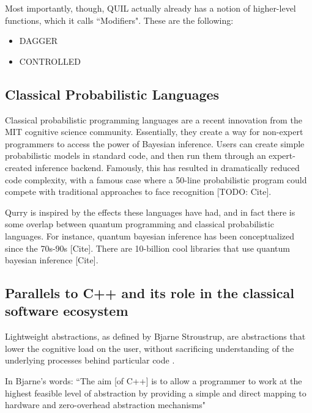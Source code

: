 \documentclass[journal]{article}
\begin{document}
Most importantly, though, QUIL actually already has a notion of higher-level functions, which it calls ``Modifiers".
These are the following:
\begin{itemize}
    \item DAGGER
    \item CONTROLLED
\end{itemize}

\subsection{Classical Probabilistic Languages}

 Classical probabilistic programming languages are a recent innovation from the MIT cognitive science community. 
 Essentially, they create a way for non-expert programmers to access the power of Bayesian inference. 
 Users can create simple probabilistic models in standard code, and then run them through an expert-created inference backend.
 Famously, this has resulted in dramatically reduced code complexity, with a famous case where a 50-line probabilistic program could compete with traditional approaches to face recognition [TODO: Cite].

 Qurry is inspired by the effects these languages have had, and in fact there is some overlap between quantum programming and classical probabilistic languages.
 For instance, quantum bayesian inference has been conceptualized since the 70s-90s [Cite].
 There are 10-billion cool libraries that use quantum bayesian inference [Cite].

\subsection{Parallels to C++ and its role in the classical software ecosystem}

Lightweight abstractions, as defined by Bjarne Stroustrup, are abstractions that lower the cognitive load on the user, without sacrificing understanding of the underlying processes behind particular code \cite{stroustrup}.

In Bjarne's words:
``The aim [of C++] is to allow a programmer to work at the highest feasible level of abstraction by providing a simple and direct mapping to hardware and zero-overhead abstraction mechanisms"
\end{document}

